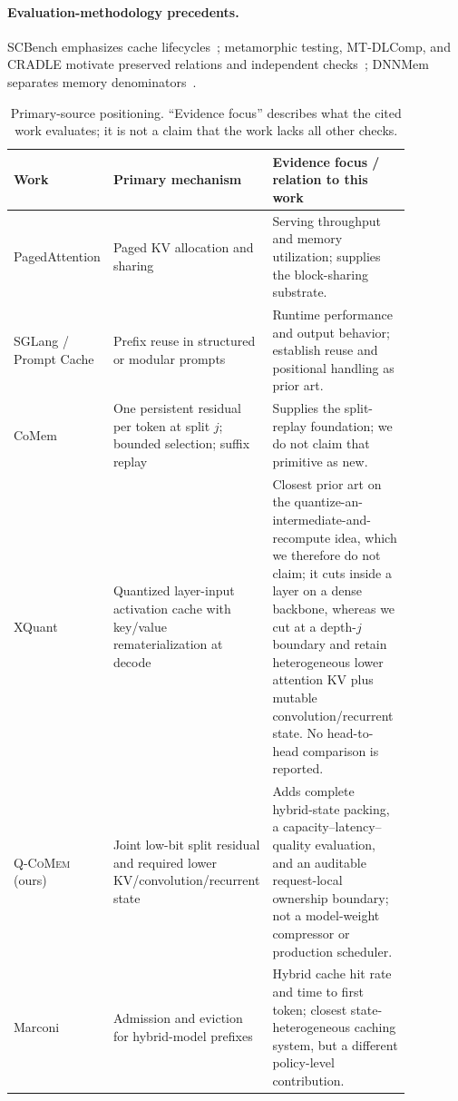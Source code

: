 \documentclass{article}
\newcommand{\qcomem}{\textsc{Q-CoMem}}
\begin{document}
\paragraph{Evaluation-methodology precedents.}
SCBench emphasizes cache lifecycles~\citep{li2025scbench}; metamorphic testing,
MT-DLComp, and CRADLE motivate preserved relations and independent
checks~\citep{chen2018metamorphic,xiao2022metamorphic,pham2019cradle}; DNNMem
separates memory denominators~\citep{gao2020dnnmem}.

\begin{table}[H]
  \caption{Primary-source positioning.  ``Evidence focus'' describes what the
  cited work evaluates; it is not a claim that the work lacks all other checks.}
  \label{tab:closest}
  \centering
  \footnotesize
  \begin{tabular}{@{}p{0.16\linewidth}p{0.28\linewidth}p{0.43\linewidth}@{}}
    \toprule
    Work & Primary mechanism & Evidence focus / relation to this work \\
    \midrule
    PagedAttention & Paged KV allocation and sharing~\citep{kwon2023pagedattention} & Serving throughput and memory utilization; supplies the block-sharing substrate. \\
    SGLang / Prompt Cache & Prefix reuse in structured or modular prompts~\citep{zheng2024sglang,gim2024promptcache} & Runtime performance and output behavior; establish reuse and positional handling as prior art. \\
    CoMem & One persistent residual per token at split $j$; bounded selection; suffix replay~\citep{liu2026comem,liu2026understanding} & Supplies the split-replay foundation; we do not claim that primitive as new. \\
    XQuant & Quantized layer-input activation cache with key/value rematerialization at decode~\citep{tomar2025xquant} & Closest prior art on the quantize-an-intermediate-and-recompute idea, which we therefore do not claim; it cuts inside a layer on a dense backbone, whereas we cut at a depth-$j$ boundary and retain heterogeneous lower attention KV plus mutable convolution/recurrent state. No head-to-head comparison is reported. \\
    \qcomem{} (ours) & Joint low-bit split residual and required lower KV/convolution/recurrent state & Adds complete hybrid-state packing, a capacity--latency--quality evaluation, and an auditable request-local ownership boundary; not a model-weight compressor or production scheduler. \\
    Marconi & Admission and eviction for hybrid-model prefixes~\citep{pan2025marconi} & Hybrid cache hit rate and time to first token; closest state-heterogeneous caching system, but a different policy-level contribution. \\

\end{tabular}
\end{table}
\end{document}
